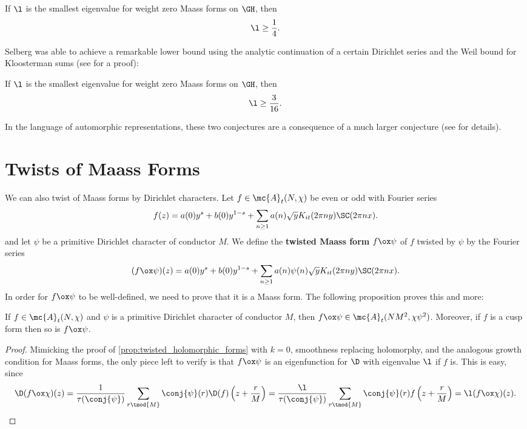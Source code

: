     \begin{conjecture}
      If $\l$ is the smallest eigenvalue for weight zero Maass forms on $\GH$, then
      \[
        \l \ge \frac{1}{4}.
      \]
    \end{conjecture}

    Selberg was able to achieve a remarkable lower bound using the analytic continuation of a certain Dirichlet series and the Weil bound for Kloosterman sums (see \cite{iwaniec2002spectral} for a proof):

    \begin{theorem}
      If $\l$ is the smallest eigenvalue for weight zero Maass forms on $\GH$, then
      \[
        \l \ge \frac{3}{16}.
      \]
    \end{theorem}

    In the language of automorphic representations, these two conjectures are a consequence of a much larger conjecture (see \cite{blomer2013role} for details).
  \section{Twists of Maass Forms}
    We can also twist of Maass forms by Dirichlet characters. Let $f \in \mc{A}_{t}(N,\chi)$ be even or odd with Fourier series
    \[
      f(z) = a(0)y^{s}+b(0)y^{1-s}+\sum_{n \ge 1}a(n)\sqrt{y}K_{it}(2\pi ny)\SC(2\pi nx).
    \]
    and let $\psi$ be a primitive Dirichlet character of conductor $M$. We define the \textbf{twisted Maass form} $f \ox \psi$ of $f$ twisted by $\psi$ by the Fourier series
    \[
      (f \ox \psi)(z) = a(0)y^{s}+b(0)y^{1-s}+\sum_{n \ge 1}a(n)\psi(n)\sqrt{y}K_{it}(2\pi ny)\SC(2\pi nx).
    \]
    In order for $f \ox \psi$ to be well-defined, we need to prove that it is a Maass form. The following proposition proves this and more:

    \begin{proposition}\label{prop:twisted_Maass_forms}
      If $f \in \mc{A}_{t}(N,\chi)$ and $\psi$ is a primitive Dirichlet character of conductor $M$, then $f \ox \psi \in \mc{A}_{t}(NM^{2},\chi\psi^{2})$. Moreover, if $f$ is a cusp form then so is $f \ox \psi$.
    \end{proposition}
    \begin{proof}
      Mimicking the proof of \cref{prop:twisted_holomorphic_forms} with $k = 0$, smoothness replacing holomorphy, and the analogous growth condition for Maass forms, the only piece left to verify is that $f \ox \psi$ is an eigenfunction for $\D$ with eigenvalue $\l$ if $f$ is. This is easy, since
      \[
        \D(f \ox \chi)(z) = \frac{1}{\tau(\conj{\psi})}\sum_{r \tmod{M}}\conj{\psi}(r)\D(f)\left(z+\frac{r}{M}\right) =  \frac{\l}{\tau(\conj{\psi})}\sum_{r \tmod{M}}\conj{\psi}(r)f\left(z+\frac{r}{M}\right) = \l(f \ox \chi)(z).
      \]
    \end{proof}